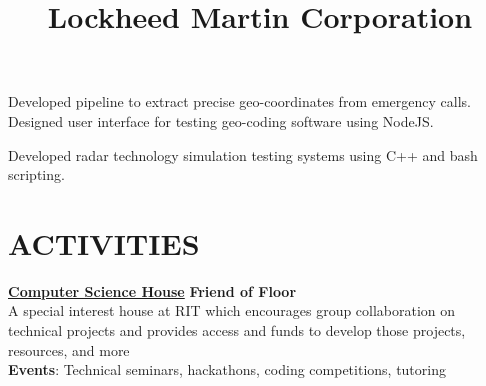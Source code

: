 \documentclass[line,margin]{res}
\begin{document}
\begin{resume}
\begin{position}
    Developed pipeline to extract precise geo-coordinates from emergency calls.\\
    Designed user interface for testing geo-coding software using NodeJS.
\end{position}
\title{\textbf{Lockheed Martin Corporation}}
\begin{position}
    Developed radar technology simulation testing systems using C++ and bash scripting.
\end{position}

\section{ACTIVITIES}
\href{https://csh.rit.edu}{\textbf{Computer Science House}}
\hfill
\textbf{Friend of Floor}\\
A special interest house at RIT which encourages group collaboration on technical 
projects and provides access and funds to develop those projects, resources, and more\\
\textbf{Events}: 
Technical seminars, hackathons, coding competitions, tutoring\\


\end{resume}
\end{document}
